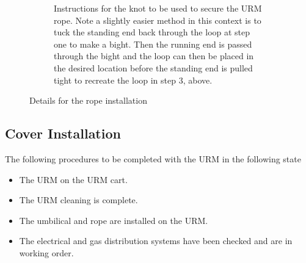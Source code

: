 \documentclass[11pt]{article}
\begin{document}
\begin{figure}
\begin{center}
\begin{subfigure}{0.5\textwidth}
  \caption{Instructions for the knot to be used to secure the URM rope. Note a slightly easier method in this context is to tuck the standing end back through the loop at step one to make a bight. Then the running end is passed through the bight and the loop can then be placed in the desired location before the standing end is pulled tight to recreate the loop in step 3, above.}
  \label{fig:bowline}
\end{subfigure}
  \end{center}
  \caption{Details for the rope installation}
  \label{fig:rope}
\end{figure}



\subsection{Cover Installation}\label{ss:CoverInstall}
The following procedures to be completed with the URM in the following state
\begin{itemize}[label=$\square$]
\item The URM on the URM cart.
\item The URM cleaning is complete.
\item The umbilical and rope are installed on the URM.
\item The electrical and gas distribution systems have been checked and are in working order. 
\end{itemize}
\end{document}
